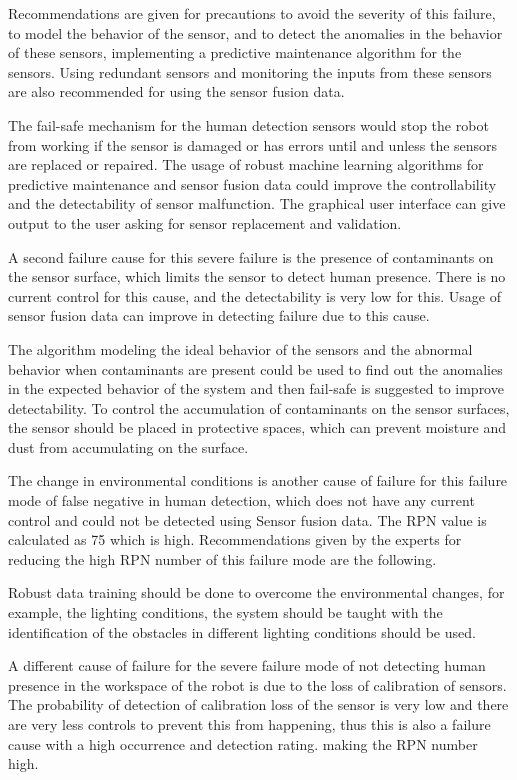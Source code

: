 {Recommendations are given for precautions to avoid the severity of this failure, to model the behavior of the sensor, and to detect the anomalies in the behavior of these sensors, implementing a predictive maintenance algorithm for the sensors. Using redundant sensors and monitoring the inputs from these sensors are also recommended for using the sensor fusion data. 

The fail-safe mechanism for the human detection sensors would stop the robot from working if the sensor is damaged or has errors until and unless the sensors are replaced or repaired. The usage of robust machine learning algorithms for predictive maintenance and sensor fusion data could improve the controllability and the detectability of sensor malfunction. The graphical user interface can give output to the user asking for sensor replacement and validation.

A second failure cause for this severe failure is the presence of contaminants on the sensor surface, which limits the sensor to detect human presence. There is no current control for this cause, and the detectability is very low for this. Usage of sensor fusion data can improve in detecting failure due to this cause.

The algorithm modeling the ideal behavior of the sensors and the abnormal behavior when contaminants are present could be used to find out the anomalies in the expected behavior of the system and then fail-safe is suggested to improve detectability. To control the accumulation of contaminants on the sensor surfaces, the sensor should be placed in protective spaces, which can prevent moisture and dust from accumulating on the surface.

The change in environmental conditions is another cause of failure for this failure mode of false negative in human detection, which does not have any current control and could not be detected using Sensor fusion data. The RPN value is calculated as 75 which is high. Recommendations given by the experts for reducing the high RPN number of this failure mode are the following.

Robust data training should be done to overcome the environmental changes, for example, the lighting conditions, the system should be taught with the identification of the obstacles in different lighting conditions should be used.

A different cause of failure for the severe failure mode of not detecting human presence in the workspace of the robot is due to the loss of calibration of sensors. The probability of detection of calibration loss of the sensor is very low and there are very less controls to prevent this from happening, thus this is also a failure cause with a high occurrence and detection rating. making the RPN number high.

}
